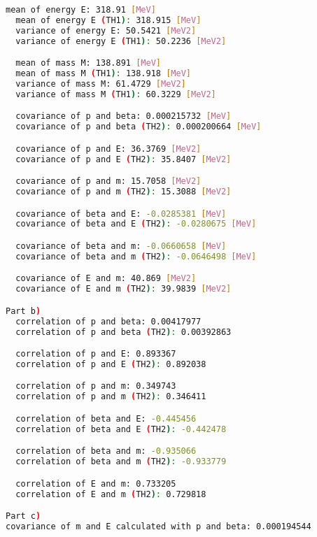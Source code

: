 \documentclass[10pt]{article}
\newenvironment{myfont}{\fontfamily{put}\selectfont}{\par}
\begin{document}
\begin{myfont}
{\begin{lstlisting}[language=bash,caption={Output of ROOT macro into terminal}]
  mean of energy E: 318.91 [MeV]
  mean of energy E (TH1): 318.915 [MeV]
  variance of energy E: 50.5421 [MeV2]
  variance of energy E (TH1): 50.2236 [MeV2]

  mean of mass M: 138.891 [MeV]
  mean of mass M (TH1): 138.918 [MeV]
  variance of mass M: 61.4729 [MeV2]
  variance of mass M (TH1): 60.3229 [MeV2]

  covariance of p and beta: 0.000215732 [MeV]
  covariance of p and beta (TH2): 0.000200664 [MeV]

  covariance of p and E: 36.3769 [MeV2]
  covariance of p and E (TH2): 35.8407 [MeV2]

  covariance of p and m: 15.7058 [MeV2]
  covariance of p and m (TH2): 15.3088 [MeV2]

  covariance of beta and E: -0.0285381 [MeV]
  covariance of beta and E (TH2): -0.0280675 [MeV]

  covariance of beta and m: -0.0660658 [MeV]
  covariance of beta and m (TH2): -0.0646498 [MeV]

  covariance of E and m: 40.869 [MeV2]
  covariance of E and m (TH2): 39.9839 [MeV2]

Part b)
  correlation of p and beta: 0.00417977
  correlation of p and beta (TH2): 0.00392863

  correlation of p and E: 0.893367
  correlation of p and E (TH2): 0.892038

  correlation of p and m: 0.349743
  correlation of p and m (TH2): 0.346411

  correlation of beta and E: -0.445456
  correlation of beta and E (TH2): -0.442478

  correlation of beta and m: -0.935066
  correlation of beta and m (TH2): -0.933779

  correlation of E and m: 0.733205
  correlation of E and m (TH2): 0.729818

Part c)
covariance of m and E calculated with p and beta: 0.000194544
\end{lstlisting}}

\end{myfont}
\end{document}
